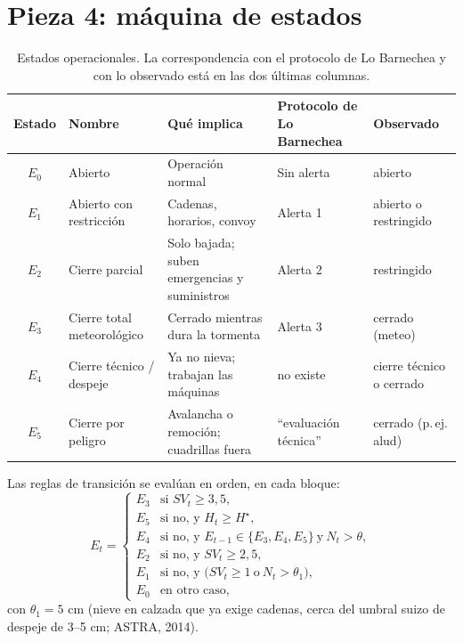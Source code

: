 \section{Pieza 4: máquina de estados}\label{sec:estados}


\begin{table}[ht]
\centering\small
\caption{Estados operacionales. La correspondencia con el protocolo de Lo Barnechea y con lo observado está en las dos últimas columnas.}
\label{tab:estados}
\begin{tabularx}{\textwidth}{|c|>{\raggedright\arraybackslash}p{3.3cm}|>{\raggedright\arraybackslash}X|>{\raggedright\arraybackslash}p{2.6cm}|>{\raggedright\arraybackslash}p{2.6cm}|}
\hline
Estado & Nombre & Qué implica & Protocolo de Lo Barnechea & Observado \\ \hline
$E_0$ & Abierto & Operación normal & Sin alerta & abierto \\ \hline
$E_1$ & Abierto con restricción & Cadenas, horarios, convoy & Alerta 1 & abierto o restringido \\ \hline
$E_2$ & Cierre parcial & Solo bajada; suben emergencias y suministros & Alerta 2 & restringido \\ \hline
$E_3$ & Cierre total meteorológico & Cerrado mientras dura la tormenta & Alerta 3 & cerrado (meteo) \\ \hline
$E_4$ & Cierre técnico / despeje & Ya no nieva; trabajan las máquinas & no existe & cierre técnico o cerrado \\ \hline
$E_5$ & Cierre por peligro & Avalancha o remoción; cuadrillas fuera & ``evaluación técnica'' & cerrado (p.\,ej. alud) \\ \hline
\end{tabularx}
\end{table}

Las reglas de transición se evalúan en orden, en cada bloque:
\begin{equation}
E_t =
\begin{cases}
E_3 & \text{si } SV_t \ge 3{,}5,\\
E_5 & \text{si no, y } H_t \ge H^\star,\\
E_4 & \text{si no, y } E_{t-1} \in \{E_3, E_4, E_5\} \ \text{y}\ N_t > \theta,\\
E_2 & \text{si no, y } SV_t \ge 2{,}5,\\
E_1 & \text{si no, y } \big(SV_t \ge 1 \ \text{o}\ N_t > \theta_1\big),\\
E_0 & \text{en otro caso,}
\end{cases}
\label{eq:estados}
\end{equation}
con $\theta_1 = 5$ cm (nieve en calzada que ya exige cadenas, cerca del umbral suizo de despeje de 3--5 cm; ASTRA, 2014).

